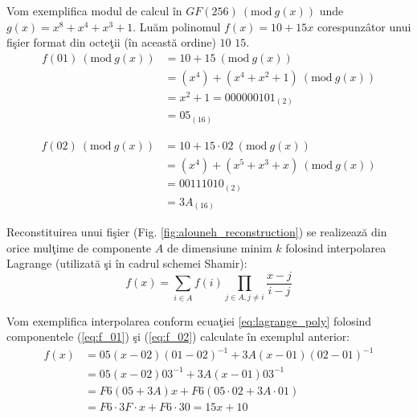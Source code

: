 \documentclass{llncs}
\newcommand{\Mod}[1]{\ (\text{mod}\ #1)}
\begin{document}

\begin{example}
Vom exemplifica modul de calcul \^{i}n $GF(256) \Mod {g(x)} $ unde $g(x) = x ^ 8 + x ^ 4 + x ^ 3 + 1$. Lu\u{a}m polinomul $f(x) = 10 + 15x$ corespunz\^{a}tor unui fi\c{s}ier format din octe\c{t}ii (\^{i}n aceast\u{a} ordine) $10$ $15$.
	\begin{equation} \label{eq:f_01}
	\begin{split}
		f(01) \Mod{g(x)} & = 10 + 15 \Mod{g(x)} \\
		& = (x ^ 4) + (x ^ 4 + x ^ 2 + 1) \Mod{g(x)} \\
		& = x ^ 2 + 1 = 000000101_{(2)} \\
		& =  05_{(16)}
	\end{split}
	\end{equation}

	\begin{equation} \label{eq:f_02}
	\begin{split}
	 f(02) \Mod{g(x)} & = 10 + 15\cdot02 \Mod{g(x)} \\
	 & = (x ^ 4) + (x ^ 5 + x ^ 3 + x) \Mod{g(x)} \\
	 & = 00111010_{(2)} \\
	 & = 3A_{(16)}
	 \end{split}
	 \end{equation}
\end{example}
Reconstituirea unui fi\c{s}ier (Fig. \ref{fig:alouneh_reconstruction}) se realizeaz\u{a} din orice mul\c{t}ime de componente $A$ de dimensiune minim $k$ folosind interpolarea Lagrange (utilizat\u{a} \c{s}i \^{i}n cadrul schemei Shamir):
\begin{equation}
	\label{eq:lagrange_poly}
	f(x)=\sum_{i \in A} f(i) \prod_{j \in A, j \neq i} \frac{x-j}{i-j}
\end{equation}

\begin{example}
Vom exemplifica interpolarea conform ecua\c{t}iei {\ref{eq:lagrange_poly}} folosind componentele (\ref{eq:f_01}) \c{s}i (\ref{eq:f_02}) calculate \^{i}n exemplul anterior:
	\begin{equation}
	\begin{split}
		f(x) & = 05(x - 02)(01 - 02)^{-1} + 3A(x - 01)(02 - 01)^{-1} \\
		& = 05(x - 02)03^{-1} + 3A(x - 01)03^{-1} \\
		& = F6(05 + 3A)x + F6(05\cdot02 + 3A \cdot 01) \\
		& = F6\cdot 3F\cdot x + F6\cdot30 = 15x + 10
	\end{split}
	\end{equation}
\end{example}
\end{document}
